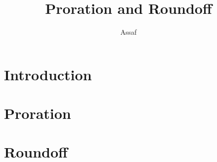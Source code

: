
\graphicspath{{./Images/}}
\def\eps{\varepsilon}

\author{Assaf}
\title{Proration and Roundoff}
\maketitle
\section{Introduction}

\section{Proration}

\section{Roundoff}


